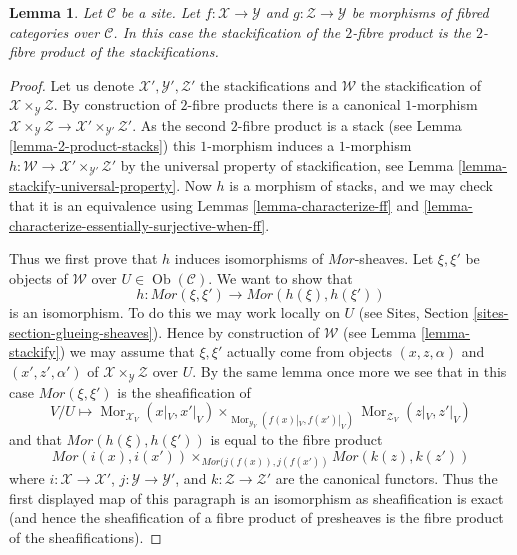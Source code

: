 \documentclass{stacks-project}
\theoremstyle{plain}
\newtheorem{lemma}[subsection]{Lemma}
\theoremstyle{definition}
\theoremstyle{remark}
\numberwithin{equation}{subsection}
\def\Mor{\mathop{\mathrm{Mor}}\nolimits}
\def\Ob{\mathop{\mathrm{Ob}}\nolimits}
\begin{document}
\begin{lemma}
\label{lemma-stackification-fibre-product-fibred-categories}
Let $\mathcal{C}$ be a site.
Let $f : \mathcal{X} \to \mathcal{Y}$ and $g : \mathcal{Z} \to \mathcal{Y}$
be morphisms of fibred categories over $\mathcal{C}$.
In this case the stackification of the $2$-fibre product is the $2$-fibre
product of the stackifications.
\end{lemma}

\begin{proof}
Let us denote $\mathcal{X}', \mathcal{Y}', \mathcal{Z}'$ the stackifications
and $\mathcal{W}$ the stackification of
$\mathcal{X} \times_\mathcal{Y} \mathcal{Z}$. By construction of $2$-fibre
products there is a canonical $1$-morphism
$\mathcal{X} \times_\mathcal{Y} \mathcal{Z} \to
\mathcal{X}' \times_{\mathcal{Y}'} \mathcal{Z}'$.
As the second $2$-fibre product is a stack (see
Lemma \ref{lemma-2-product-stacks})
this $1$-morphism induces a $1$-morphism
$h : \mathcal{W} \to \mathcal{X}' \times_{\mathcal{Y}'} \mathcal{Z}'$
by the universal property of stackification, see
Lemma \ref{lemma-stackify-universal-property}.
Now $h$ is a morphism of stacks, and we may check that it is an
equivalence using
Lemmas \ref{lemma-characterize-ff} and
\ref{lemma-characterize-essentially-surjective-when-ff}.

\medskip\noindent
Thus we first prove that $h$ induces isomorphisms of $\mathit{Mor}$-sheaves.
Let $\xi, \xi'$ be objects of $\mathcal{W}$ over
$U \in \Ob(\mathcal{C})$. We want to show that
$$
h : \mathit{Mor}(\xi, \xi') \longrightarrow \mathit{Mor}(h(\xi), h(\xi'))
$$
is an isomorphism. To do this we may work locally on $U$ (see
Sites, Section \ref{sites-section-glueing-sheaves}).
Hence by construction of $\mathcal{W}$ (see
Lemma \ref{lemma-stackify})
we may assume that $\xi, \xi'$
actually come from objects $(x, z, \alpha)$ and $(x', z', \alpha')$
of $\mathcal{X} \times_\mathcal{Y} \mathcal{Z}$ over $U$.
By the same lemma once more we see that in this case
$\mathit{Mor}(\xi, \xi')$ is the sheafification of
$$
V/U \longmapsto
\Mor_{\mathcal{X}_V}(x|_V, x'|_V)
\times_{\Mor_{\mathcal{Y}_V}(f(x)|_V, f(x')|_V)}
\Mor_{\mathcal{Z}_V}(z|_V, z'|_V)
$$
and that $\mathit{Mor}(h(\xi), h(\xi'))$ is equal to the fibre product
$$
\mathit{Mor}(i(x), i(x'))
\times_{\mathit{Mor}(j(f(x)), j(f(x'))}
\mathit{Mor}(k(z), k(z'))
$$
where $i : \mathcal{X} \to \mathcal{X}'$,
$j : \mathcal{Y} \to \mathcal{Y}'$, and
$k : \mathcal{Z} \to \mathcal{Z}'$ are the canonical functors.
Thus the first displayed map of this paragraph is an isomorphism as
sheafification is exact (and hence the sheafification of a fibre product
of presheaves is the fibre product of the sheafifications).


\end{proof}
\end{document}
